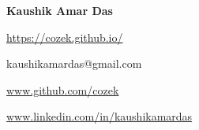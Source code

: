 \documentclass{resume} %
\begin{document}
\begin{minipage}{0.8\textwidth}

{\Huge  \bf Kaushik Amar Das}\vspace{10px} \\
\par
\faGlobe \enspace \url{https://cozek.github.io/} \par
\faEnvelope \enspace kaushikamardas@gmail.com \par
\faGithubSquare \enspace \url{www.github.com/cozek} \par
\faLinkedinSquare \enspace \url{www.linkedin.com/in/kaushikamardas} \par
\end{minipage}
\noindent\begin{minipage}{0.2\textwidth}%
\end{minipage}%
\hfill%
\newline




\end{document}
